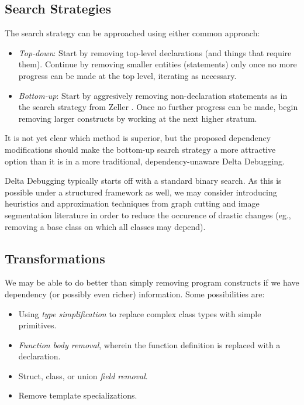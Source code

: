 \documentclass[11pt]{article}
\begin{document}
\subsection{Search Strategies}
The search strategy can be approached using either common approach:
\begin{itemize}
\item \emph{Top-down}: Start by removing top-level declarations (and things that
  require them). Continue by removing smaller entities (statements) only once no
  more progress can be made at the top level, iterating as necessary.
\item \emph{Bottom-up}: Start by aggresively removing non-declaration statements
  as in the search strategy from Zeller \citet{dd}. Once no further progress can
  be made, begin removing larger constructs by working at the next higher
  stratum.
\end{itemize}
It is not yet clear which method is superior, but the proposed dependency
modifications should make the bottom-up search strategy a more attractive option
than it is in a more traditional, dependency-unaware Delta Debugging.

Delta Debugging typically starts off with a standard binary search. As this is
possible under a structured framework as well, we may consider introducing
heuristics and approximation techniques from graph cutting and image
segmentation literature \citep{nc} in order to reduce the occurence of
drastic changes (eg., removing a base class on which all classes may depend).

\subsection{Transformations}
We may be able to do better than simply removing program constructs if we have
dependency (or possibly even richer) information.  Some possibilities are:
\begin{itemize}
\item Using \emph{type simplification} to replace complex class types with
  simple primitives.
\item \emph{Function body removal}, wherein the function definition is replaced
  with a declaration.
\item Struct, class, or union \emph{field removal}.
\item Remove template specializations.
\end{itemize}
\end{document}

